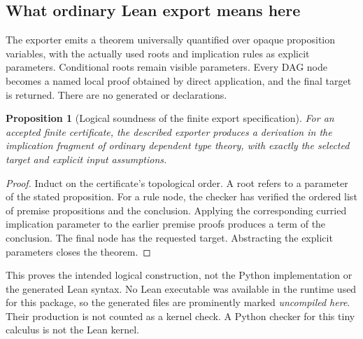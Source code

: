 \documentclass[11pt,a4paper]{article}
\newtheorem{proposition}[theorem]{Proposition}
\theoremstyle{definition}
\theoremstyle{remark}
\newcommand{\code}[1]{\texttt{\detokenize{#1}}}
\begin{document}
\subsection{What ordinary Lean export means here}
The exporter emits a theorem universally quantified over opaque proposition
variables, with the actually used roots and implication rules as explicit
parameters. Conditional roots remain visible parameters. Every DAG node becomes
a named local proof obtained by direct application, and the final target is
returned. There are no generated \code{axiom} or \code{sorry} declarations.

\begin{proposition}[Logical soundness of the finite export specification]
For an accepted finite certificate, the described exporter produces a derivation
in the implication fragment of ordinary dependent type theory, with exactly
the selected target and explicit input assumptions.
\end{proposition}
\begin{proof}
Induct on the certificate's topological order. A root refers to a parameter of
the stated proposition. For a rule node, the checker has verified the ordered
list of premise propositions and the conclusion. Applying the corresponding
curried implication parameter to the earlier premise proofs produces a term
of the conclusion. The final node has the requested target. Abstracting the
explicit parameters closes the theorem.
\end{proof}

This proves the intended logical construction, not the Python implementation
or the generated Lean syntax. No Lean executable was available in the runtime
used for this package, so the generated \code{.lean} files are prominently
marked \emph{uncompiled here}. Their production is not counted as a kernel
check. A Python checker for this tiny calculus is not the Lean kernel.
\end{document}
